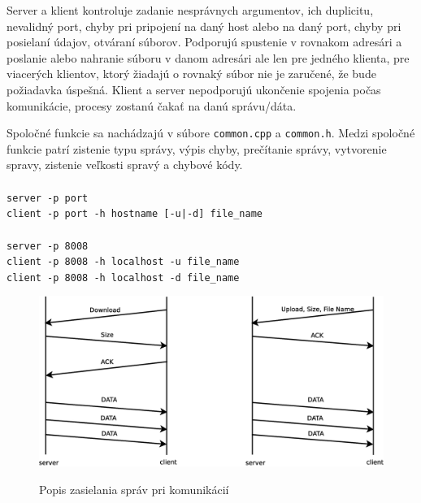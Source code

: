 \documentclass[10pt,a4paper,final]{article}
\begin{document}
Server a klient kontroluje zadanie nesprávnych argumentov, ich duplicitu,
nevalidný port, chyby pri pripojení na daný host alebo na daný port,
chyby pri posielaní údajov, otváraní súborov. Podporujú spustenie
v rovnakom adresári a poslanie alebo nahranie súboru v danom adresári
ale len pre jedného klienta, pre viacerých klientov, ktorý žiadajú
o rovnaký súbor nie je zaručené, že bude požiadavka úspešná. Klient
a server nepodporujú ukončenie spojenia počas komunikácie, procesy
zostanú čakať na danú správu/dáta.

Spoločné funkcie sa nachádzajú v súbore \texttt{common.cpp} a \texttt{common.h}. Medzi spoločné funkcie patrí zistenie typu správy, výpis chyby, prečítanie správy, vytvorenie spravy, zistenie veľkosti spravý a chybové kódy.
\\\\
\texttt{server -p port}\\
\texttt{client -p port -h hostname [{-u|-d}] {file\_name}}\\\\
\texttt{server -p 8008}\\
\texttt{client -p 8008 -h localhost {-u} {file\_name}}\\
\texttt{client -p 8008 -h localhost {-d} {file\_name}}\\



\begin{figure}[ht]
\begin{center}
\scalebox{0.34}
{	\includegraphics{Diagram1.eps}
	}
\caption{Popis zasielania správ pri komunikácií}
\label{etiopan}
\end{center}
\end{figure}


    
\end{document}
